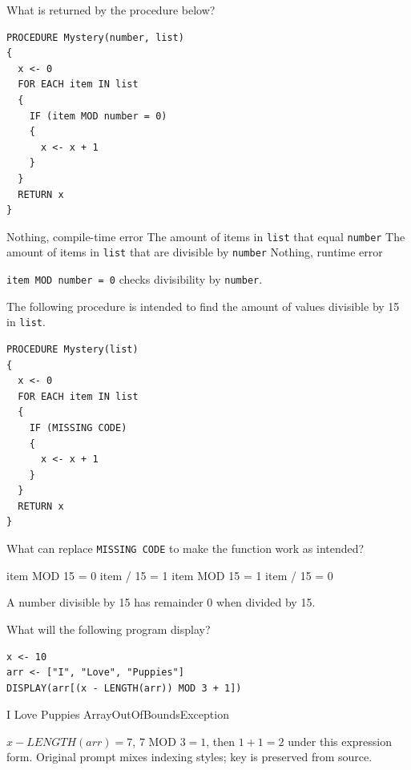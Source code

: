 \question[5]
What is returned by the procedure below?
\begin{lstlisting}[style=pseudo]
PROCEDURE Mystery(number, list)
{
  x <- 0
  FOR EACH item IN list
  {
    IF (item MOD number = 0)
    {
      x <- x + 1
    }
  }
  RETURN x
}
\end{lstlisting}
\begin{choices}
  \choice Nothing, compile-time error
  \choice The amount of items in \texttt{list} that equal \texttt{number}
  \CorrectChoice The amount of items in \texttt{list} that are divisible by \texttt{number}
  \choice Nothing, runtime error
\end{choices}
\begin{solution}
  \texttt{item MOD number = 0} checks divisibility by \texttt{number}.
\end{solution}

\newpage

\question[5]
The following procedure is intended to find the amount of values divisible by 15 in \texttt{list}.
\begin{lstlisting}[style=pseudo]
PROCEDURE Mystery(list)
{
  x <- 0
  FOR EACH item IN list
  {
    IF (MISSING CODE)
    {
      x <- x + 1
    }
  }
  RETURN x
}
\end{lstlisting}
What can replace \texttt{MISSING CODE} to make the function work as intended?
\begin{choices}
  \CorrectChoice item MOD 15 = 0
  \choice item / 15 = 1
  \choice item MOD 15 = 1
  \choice item / 15 = 0
\end{choices}
\begin{solution}
  A number divisible by 15 has remainder 0 when divided by 15.
\end{solution}

\question[5]
What will the following program display?
\begin{lstlisting}[style=pseudo]
x <- 10
arr <- ["I", "Love", "Puppies"]
DISPLAY(arr[(x - LENGTH(arr)) MOD 3 + 1])
\end{lstlisting}
\begin{choices}
  \CorrectChoice I
  \choice Love
  \choice Puppies
  \choice ArrayOutOfBoundsException
\end{choices}
\begin{solution}
  \(x - LENGTH(arr) = 7\), \(7 \text{ MOD } 3 = 1\), then \(1+1=2\) under this expression form. Original prompt mixes indexing styles; key is preserved from source.
\end{solution}

